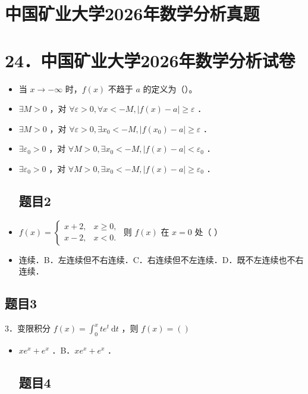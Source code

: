 \documentclass{article}
\begin{document}
\section*{中国矿业大学2026年数学分析真题}
\section*{24．中国矿业大学2026年数学分析试卷}
\begin{itemize}

\subsection{题目1}
  \item[1．] 当 \(x \rightarrow-\infty\) 时，\(f(x)\) 不趋于 \(a\) 的定义为（）。
  \item[A．] \(\exists M>0\) ，对 \(\forall \varepsilon>0, \forall x<-M,|f(x)-a| \geq \varepsilon\) ．
  \item[B．] \(\exists M>0\) ，对 \(\forall \varepsilon>0, \exists x_{0}<-M,\left|f\left(x_{0}\right)-a\right| \geq \varepsilon\) ．
  \item[C．] \(\exists \varepsilon_{0}>0\) ，对 \(\forall M>0, \exists x_{0}<-M,|f(x)-a|<\varepsilon_{0}\) ．
  \item[D．] \(\exists \varepsilon_{0}>0\) ，对 \(\forall M>0, \exists x_{0}<-M,|f(x)-a| \geq \varepsilon_{0}\) ．

\subsection{题目2}
  \item[2．] \(f(x)=\left\{\begin{array}{ll}x+2, & x \geq 0, \\ x-2, & x<0 .\end{array}\right.\) 则 \(f(x)\) 在 \(x=0\) 处（ ）
  \item[A．] 连续．B．左连续但不右连续．C．右连续但不左连续．D．既不左连续也不右连续．
\end{itemize}

\subsection{题目3}
3．变限积分 \(f(x)=\int_{0}^{x} t e^{t} \mathrm{~d} t\) ，则 \(f(x)=()\)

\begin{itemize}
  \item[A．] \(x e^{x}+e^{x}\) ．B．\(x e^{x}+e^{x}\) ．

\subsection{题目4}
\end{itemize}
\end{document}
